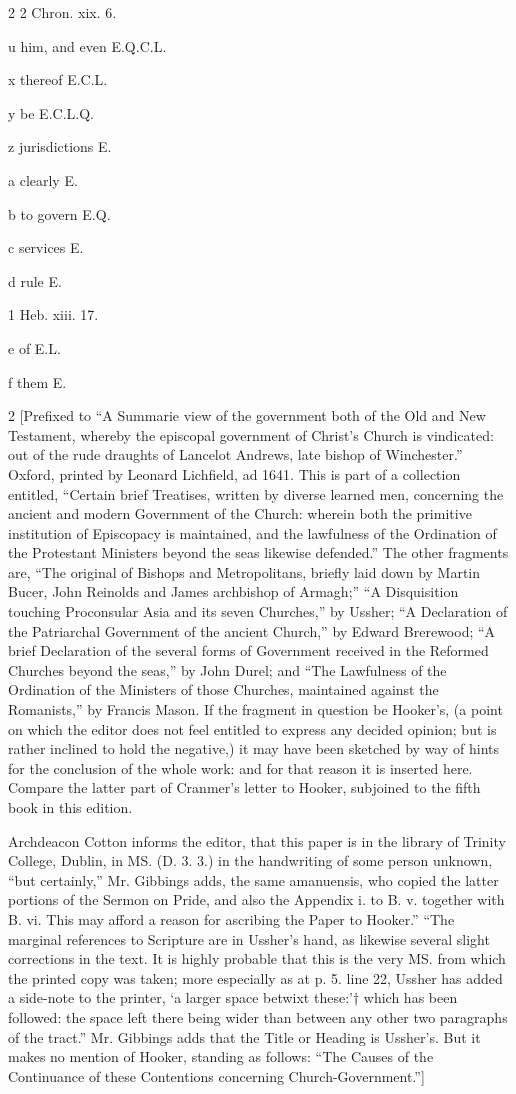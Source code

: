 2
2 Chron. xix. 6.

u
him, and even E.Q.C.L.

x
thereof E.C.L.

y
be E.C.L.Q.

z
jurisdictions E.

a
clearly E.

b
to govern E.Q.

c
services E.

d
rule E.

1
Heb. xiii. 17.

e
of E.L.

f
them E.

2
[Prefixed to “A Summarie view of the government both of the Old and New Testament, whereby the episcopal government of Christ’s Church is vindicated: out of the rude draughts of Lancelot Andrews, late bishop of Winchester.” Oxford, printed by Leonard Lichfield, ad 1641. This is part of a collection entitled, “Certain brief Treatises, written by diverse learned men, concerning the ancient and modern Government of the Church: wherein both the primitive institution of Episcopacy is maintained, and the lawfulness of the Ordination of the Protestant Ministers beyond the seas likewise defended.” The other fragments are, “The original of Bishops and Metropolitans, briefly laid down by Martin Bucer, John Reinolds and James archbishop of Armagh;” “A Disquisition touching Proconsular Asia and its seven Churches,” by Ussher; “A Declaration of the Patriarchal Government of the ancient Church,” by Edward Brerewood; “A brief Declaration of the several forms of Government received in the Reformed Churches beyond the seas,” by John Durel; and “The Lawfulness of the Ordination of the Ministers of those Churches, maintained against the Romanists,” by Francis Mason. If the fragment in question be Hooker’s, (a point on which the editor does not feel entitled to express any decided opinion; but is rather inclined to hold the negative,) it may have been sketched by way of hints for the conclusion of the whole work: and for that reason it is inserted here. Compare the latter part of Cranmer’s letter to Hooker, subjoined to the fifth book in this edition.

Archdeacon Cotton informs the editor, that this paper is in the library of Trinity College, Dublin, in MS. (D. 3. 3.) in the handwriting of some person unknown, “but certainly,” Mr. Gibbings adds, the same amanuensis, who copied the latter portions of the Sermon on Pride, and also the Appendix i. to B. v. together with B. vi. This may afford a reason for ascribing the Paper to Hooker.” “The marginal references to Scripture are in Ussher’s hand, as likewise several slight corrections in the text. It is highly probable that this is the very MS. from which the printed copy was taken; more especially as at p. 5. line 22, Ussher has added a side-note to the printer, ‘a larger space betwixt these:’† which has been followed: the space left there being wider than between any other two paragraphs of the tract.” Mr. Gibbings adds that the Title or Heading is Ussher’s. But it makes no mention of Hooker, standing as follows: “The Causes of the Continuance of these Contentions concerning Church-Government.”]

